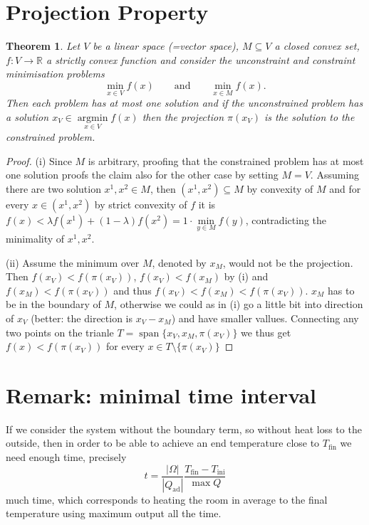 \documentclass[landscape,parskip=half,7pt]{scrartcl}
\newtheorem{theorem}{Theorem}
\DeclareMathOperator{\argmin}{argmin}
\begin{document}
	\section{Projection Property}

	\begin{theorem}
		Let $V$ be a linear space (=vector space), $M\subseteq V$ a closed convex set, $f:V\to\mathbb R$ a strictly convex function and consider the unconstraint and constraint minimisation problems
		$$ \min\limits_{x\in V} f(x)\qquad \text{and}\qquad \min\limits_{x\in M} f(x).$$
		Then each problem has at most one solution and if the unconstrained problem has a solution $x_V\in\argmin\limits_{x\in V} f(x)$ then the projection $\pi(x_V)$ is the solution to the constrained problem.
	\end{theorem}
	\begin{proof}
		(i) Since $M$ is arbitrary, proofing that the constrained problem has at most one solution proofs the claim also for the other case by setting $M=V$. Assuming there are two solution $x^1,x^2\in M$, then $(x^1,x^2)\subseteq M$ by convexity of $M$ and for every $x\in(x^1,x^2)$ by strict convexity of $f$ it is $f(x)<\lambda f(x^1)+(1-\lambda)f(x^2)=1\cdot \min\limits_{y\in M} f(y)$, contradicting the minimality of $x^1,x^2$.

		(ii) Assume the minimum over $M$, denoted by $x_M$, would not be the projection. Then $f(x_V)<f(\pi(x_V))$, $f(x_V)<f(x_M)$ by (i) and $f(x_M)<f(\pi(x_V))$ and thus $f(x_V)<f(x_M)<f(\pi(x_V))$. $x_M$ has to be in the boundary of $M$, otherwise we could as in (i) go a little bit into direction of $x_V$ (better: the direction is $x_V-x_M$) and have smaller vallues. Connecting any two points on the trianle $T=\operatorname{span}\{x_V,x_M,\pi(x_V)\}$ we thus get $f(x)<f(\pi(x_V))$ for every $x\in T\setminus\{\pi(x_V)\}$
	\end{proof}


	\section{Remark: minimal time interval}

	If we consider the system without the boundary term, so without heat loss to the outside, then in order to be able to achieve an end temperature close to $T_\text{fin}$ we need enough time, precisely
	$$t=\frac{|\Omega|}{|Q_\text{ad}|}\frac{T_\text{fin}-T_\text{ini}}{\max Q}$$
	much time, which corresponds to heating the room in average to the final temperature using maximum output all the time.
\end{document}
